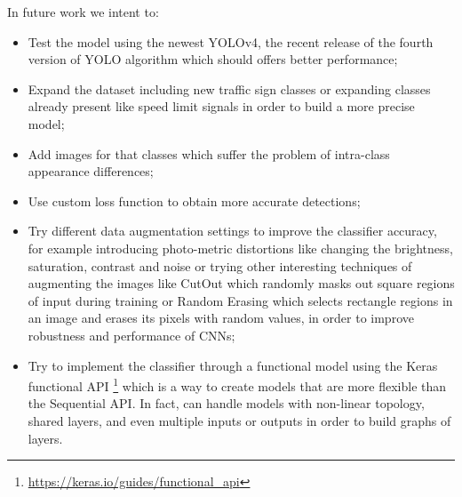 \documentclass[10pt,twocolumn,letterpaper]{article}
\begin{document}
In future work we intent to:
\begin{itemize}[noitemsep,topsep=0pt]
	\item Test the model using the newest YOLOv4, the recent release of the fourth version of YOLO algorithm which should offers better performance;
	\item Expand the dataset including new traffic sign classes or expanding classes already present like speed limit signals in order to build a more precise model;
	\item Add images for that classes which suffer the problem of intra-class appearance differences;
	\item Use custom loss function to obtain more accurate detections;
	\item Try different data augmentation settings to improve the classifier accuracy, for example introducing photo-metric distortions like changing the brightness, saturation, contrast and noise or trying other interesting techniques of augmenting the images like CutOut \cite{cutout} which randomly masks out square regions of input during training  or Random Erasing \cite{random} which selects rectangle regions in an image and erases its pixels with random values, in order to improve robustness and performance of CNNs;
	\item Try to implement the classifier through a functional model using the Keras functional API \footnote{\url{https://keras.io/guides/functional_api}}  which is a way to create models that are more flexible than the Sequential API. In fact, can handle models with non-linear topology, shared layers, and even multiple inputs or outputs in order to build graphs of layers.
\end{itemize}
\end{document}

